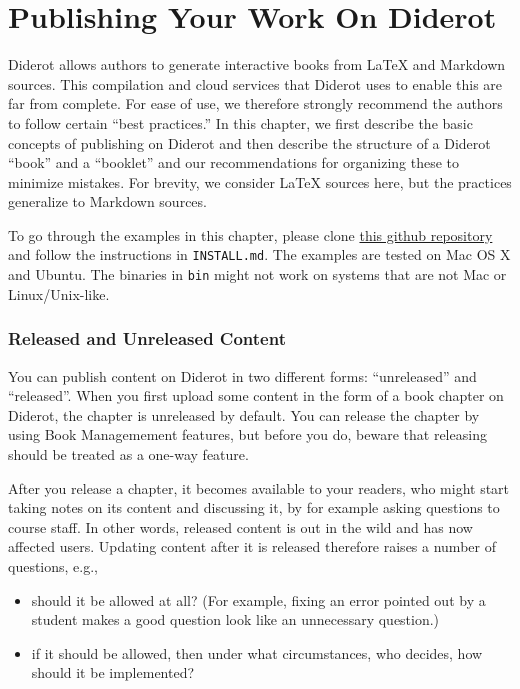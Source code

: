 \chapter{Publishing Your Work On Diderot}
\label{ch:publish}

Diderot allows authors to generate interactive books from LaTeX and Markdown sources.
%
This compilation and cloud services that Diderot uses to enable this are far from complete.
%
For ease of use, we therefore strongly recommend the authors to follow certain ``best practices.''
%
In this chapter, we first describe the basic concepts of publishing on
Diderot and then describe the structure of a Diderot ``book'' and a ``booklet'' and our recommendations for organizing these to minimize mistakes.
%
For brevity, we consider LaTeX sources here, but the practices generalize to Markdown sources.
  

\begin{important}[Sources]
To go through the examples in this chapter, please clone 
%
\href{https://github.com/diderot-edu/diderot-guide}{this github repository}
%
and follow the instructions in \lstinline`INSTALL.md`. 
%
The examples are tested on Mac OS X and Ubuntu.  The binaries in \lstinline`bin` might not work on systems that are not Mac or Linux/Unix-like. 
\end{important}

\subsection{Released and Unreleased Content}

You can publish content on Diderot in two different forms: ``unreleased'' and ``released''.
%
When you first upload some content in the form of a book chapter on Diderot, the chapter is unreleased by default.
%
You can release the chapter by using Book Managemement features, but before you  do, beware that releasing should be treated as a one-way feature.
%

After you release a chapter, it becomes available to your readers, who might start taking notes on its content and discussing it, by for example asking questions to course staff.
%
In other words, released content is out in the wild and has now affected users.
%
Updating content after it is released  therefore raises a number of questions, e.g.,
\begin{itemize}
\item should it be allowed at all? (For example, fixing an error pointed out by a student makes a good question look like an unnecessary question.)

\item if it should be allowed, then under what circumstances, who decides, how should it be implemented?
\end{itemize}

